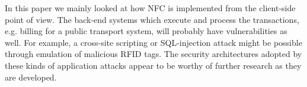 In this paper we mainly looked at how NFC is implemented from the client-side point of view.
The back-end systems which execute and process the transactions, e.g. billing for a public transport system, will probably have vulnerabilities as well.
For example, a cross-site scripting or SQL-injection attack might be possible through emulation of malicious RFID tags.\cite{rieback2006your}
The security architectures adopted by these kinds of application attacks appear to be worthy of further research as they are developed.

